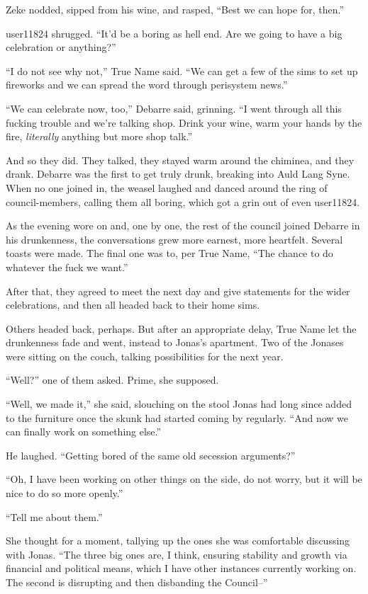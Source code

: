 Zeke nodded, sipped from his wine, and rasped, ``Best we can hope for, then.''

user11824 shrugged. ``It'd be a boring as hell end. Are we going to have a big celebration or anything?''

``I do not see why not,'' True Name said. ``We can get a few of the sims to set up fireworks and we can spread the word through perisystem news.''

``We can celebrate now, too,'' Debarre said, grinning. ``I went through all this fucking trouble and we're talking shop. Drink your wine, warm your hands by the fire, \emph{literally} anything but more shop talk.''

And so they did. They talked, they stayed warm around the chiminea, and they drank. Debarre was the first to get truly drunk, breaking into Auld Lang Syne. When no one joined in, the weasel laughed and danced around the ring of council-members, calling them all boring, which got a grin out of even user11824.

As the evening wore on and, one by one, the rest of the council joined Debarre in his drunkenness, the conversations grew more earnest, more heartfelt. Several toasts were made. The final one was to, per True Name, ``The chance to do whatever the fuck we want.''

After that, they agreed to meet the next day and give statements for the wider celebrations, and then all headed back to their home sims.

Others headed back, perhaps. But after an appropriate delay, True Name let the drunkenness fade and went, instead to Jonas's apartment. Two of the Jonases were sitting on the couch, talking possibilities for the next year.

``Well?'' one of them asked. Prime, she supposed.

``Well, we made it,'' she said, slouching on the stool Jonas had long since added to the furniture once the skunk had started coming by regularly. ``And now we can finally work on something else.''

He laughed. ``Getting bored of the same old secession arguments?''

``Oh, I have been working on other things on the side, do not worry, but it will be nice to do so more openly.''

``Tell me about them.''

She thought for a moment, tallying up the ones she was comfortable discussing with Jonas. ``The three big ones are, I think, ensuring stability and growth via financial and political means, which I have other instances currently working on. The second is disrupting and then disbanding the Council--''

